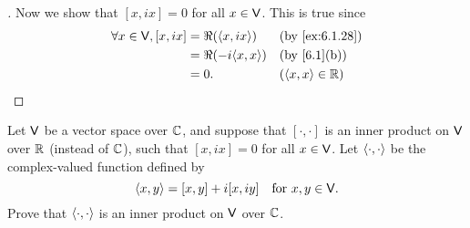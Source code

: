 \begin{proof}[]
  Now we show that \([x, ix] = 0\) for all \(x \in \mathsf{V}\).
  This is true since
  \begin{align*}
    \forall x \in \V, [x, ix] & = \Re(\inn{x, ix})   &  & \text{(by \cref{ex:6.1.28})} \\
                              & = \Re(-i \inn{x, x}) &  & \text{(by \cref{6.1}(b))}    \\
                              & = 0.                 &  & (\inn{x, x} \in \R)
  \end{align*}
\end{proof}

\begin{ex}\label{ex:6.1.29}
  Let \(\mathsf{V}\) be a vector space over \(\mathbb{C}\), and suppose that \([\cdot, \cdot]\) is an inner product on \(\mathsf{V}\) over \(\mathbb{R}\) (instead of \(\mathbb{C}\)), such that \([x, ix] = 0\) for all \(x \in \mathsf{V}\).
  Let \(\left\langle\cdot, \cdot\right\rangle\) be the complex-valued function defined by
  \[
    \left\langle x, y\right\rangle = [x, y] + i[x, iy] \quad \text{for } x, y \in \mathsf{V}.
  \]
  Prove that \(\left\langle\cdot, \cdot\right\rangle\) is an inner product on \(\mathsf{V}\) over \(\mathbb{C}\).
\end{ex}

